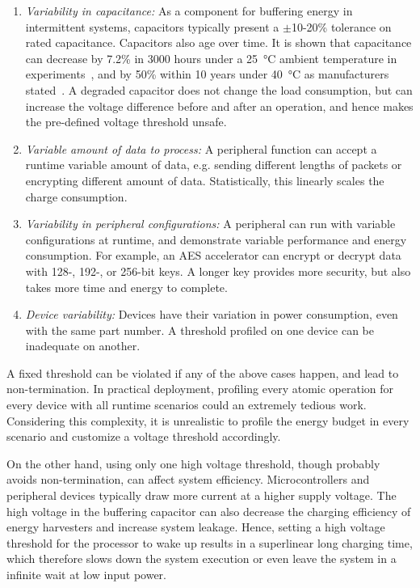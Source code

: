 \begin{enumerate}
    \item \textit{Variability in capacitance:} 
    As a component for buffering energy in intermittent systems, capacitors typically present a $\pm$10-20\% tolerance on rated capacitance. 
    Capacitors also age over time. 
    It is shown that capacitance can decrease by 7.2\% in 3000 hours under a \SI{25}{\celsius} ambient temperature in experiments~\cite{kulkarni2010experimental}, and by 50\% within 10 years under \SI{40}{\celsius} as manufacturers stated~\cite{vishaycapacitor}.
    A degraded capacitor does not change the load consumption, but can increase the voltage difference before and after an operation, and hence makes the pre-defined voltage threshold unsafe. 

    \item \textit{Variable amount of data to process:}
    A peripheral function can accept a runtime variable amount of data, e.g. sending different lengths of packets or encrypting different amount of data. 
    Statistically, this linearly scales the charge consumption.

    \item \textit{Variability in peripheral configurations:}
    A peripheral can run with variable configurations at runtime, and demonstrate variable performance and energy consumption. 
    For example, an AES accelerator can encrypt or decrypt data with 128-, 192-, or 256-bit keys. 
    A longer key provides more security, but also takes more time and energy to complete.

    \item \textit{Device variability:}
    Devices have their variation in power consumption, even with the same part number. 
    A threshold profiled on one device can be inadequate on another. 
\end{enumerate}

A fixed threshold can be violated if any of the above cases happen, and lead to non-termination. 
In practical deployment, profiling every atomic operation for every device with all runtime scenarios could an extremely tedious work.
Considering this complexity, it is unrealistic to profile the energy budget in every scenario and customize a voltage threshold accordingly. 




On the other hand, using only one high voltage threshold, though probably avoids non-termination, can affect system efficiency. Microcontrollers and peripheral devices typically draw more current at a higher supply voltage. The high voltage in the buffering capacitor can also decrease the charging efficiency of energy harvesters and increase system leakage. Hence, setting a high voltage threshold for the processor to wake up results in a superlinear long charging time, which therefore slows down the system execution or even leave the system in a infinite wait at low input power. 


